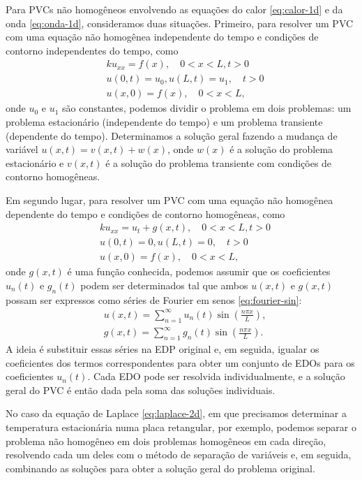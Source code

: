 \documentclass{article}
\begin{document}
Para PVCs não homogêneos envolvendo as equações do calor \eqref{eq:calor-1d} e da onda \eqref{eq:onda-1d}, consideramos duas situações. Primeiro, para resolver um PVC com uma equação não homogênea independente do tempo e condições de contorno independentes do tempo, como 
    \begin{align}
        &k u_{xx} = f(x), \quad 0 < x < L, t > 0 \\
        & u(0, t) = u_0, u(L, t) = u_1, \quad t > 0 \\
        & u(x, 0) = f(x), \quad 0 < x < L,
    \end{align}
    \noindent onde \(u_0\) e \(u_1\) são constantes, podemos dividir o problema em dois problemas: um problema estacionário (independente do tempo) e um problema transiente (dependente do tempo). Determinamos a solução geral fazendo a mudança de variável \(u(x,t) = v(x,t) + w(x)\), onde \(w(x)\) é a solução do problema estacionário e \(v(x,t)\) é a solução do problema transiente com condições de contorno homogêneas.

Em segundo lugar, para resolver um PVC com uma equação não homogênea dependente do tempo e condições de contorno homogêneas, como 
    \begin{align}
        &k u_{xx} = u_t + g(x,t), \quad 0 < x < L, t > 0 \\
        & u(0, t) = 0, u(L, t) = 0, \quad t > 0 \\
        & u(x, 0) = f(x), \quad 0 < x < L,
    \end{align}
    \noindent onde \(g(x,t)\) é uma função conhecida, podemos assumir que os coeficientes \(u_n(t)\) e \(g_n(t)\) podem ser determinados tal que ambos \(u(x,t)\) e \(g(x,t)\) possam ser expressos como séries de Fourier em senos \eqref{eq:fourier-sin}:
    \begin{align}
        &u(x,t) = \sum_{n=1}^{\infty} u_n(t) \sin\left(\frac{n\pi x}{L}\right), \\
        &g(x,t) = \sum_{n=1}^{\infty} g_n(t) \sin\left(\frac{n\pi x}{L}\right).
    \end{align}
    A ideia é substituir essas séries na EDP original e, em seguida, igualar os coeficientes dos termos correspondentes para obter um conjunto de EDOs para os coeficientes \(u_n(t)\). Cada EDO pode ser resolvida individualmente, e a solução geral do PVC é então dada pela soma das soluções individuais.

No caso da equação de Laplace \eqref{eq:laplace-2d}, em que precisamos determinar a temperatura estacionária numa placa retangular, por exemplo, podemos separar o problema não homogêneo em dois problemas homogêneos em cada direção, resolvendo cada um deles com o método de separação de variáveis e, em seguida, combinando as soluções para obter a solução geral do problema original.
\end{document}
